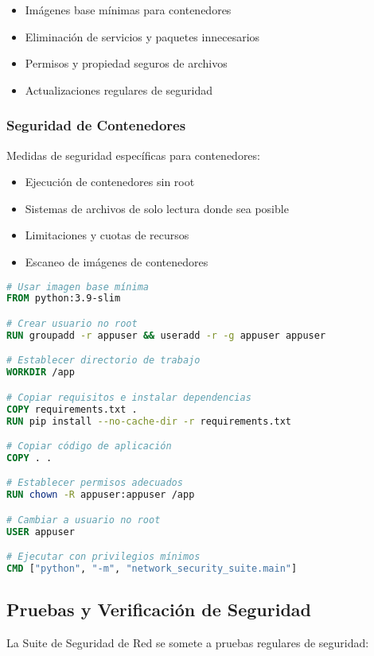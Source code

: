 \begin{itemize}
    \item Imágenes base mínimas para contenedores
    \item Eliminación de servicios y paquetes innecesarios
    \item Permisos y propiedad seguros de archivos
    \item Actualizaciones regulares de seguridad
\end{itemize}

\subsubsection{Seguridad de Contenedores}
Medidas de seguridad específicas para contenedores:

\begin{itemize}
    \item Ejecución de contenedores sin root
    \item Sistemas de archivos de solo lectura donde sea posible
    \item Limitaciones y cuotas de recursos
    \item Escaneo de imágenes de contenedores
\end{itemize}

\begin{lstlisting}[language=dockerfile, caption=Ejemplo de Dockerfile Seguro]
# Usar imagen base mínima
FROM python:3.9-slim

# Crear usuario no root
RUN groupadd -r appuser && useradd -r -g appuser appuser

# Establecer directorio de trabajo
WORKDIR /app

# Copiar requisitos e instalar dependencias
COPY requirements.txt .
RUN pip install --no-cache-dir -r requirements.txt

# Copiar código de aplicación
COPY . .

# Establecer permisos adecuados
RUN chown -R appuser:appuser /app

# Cambiar a usuario no root
USER appuser

# Ejecutar con privilegios mínimos
CMD ["python", "-m", "network_security_suite.main"]
\end{lstlisting}

\subsection{Pruebas y Verificación de Seguridad}
La Suite de Seguridad de Red se somete a pruebas regulares de seguridad:

